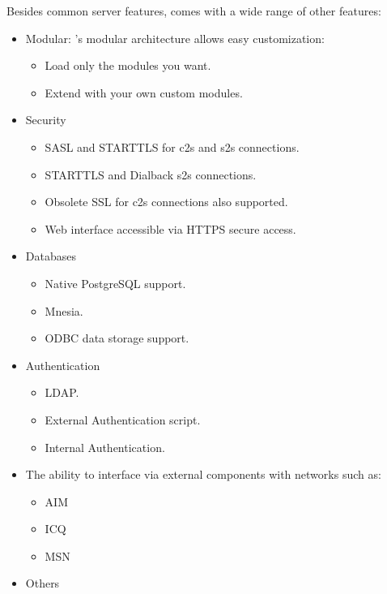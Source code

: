 Besides common \Jabber{} server features, \ejabberd{} comes with a wide range of other features:
\begin{itemize}
\item Modular: \ejabberd{}'s modular architecture allows easy customization:
\begin{itemize}
\item Load only the modules you want.
\item Extend \ejabberd{} with your own custom modules.
\end{itemize}
\item Security
\begin{itemize}
\item SASL and STARTTLS for c2s and s2s connections.\improved{}
\item STARTTLS and Dialback s2s connections.\new{}
\item Obsolete SSL for c2s connections also supported.
\item Web interface accessible via HTTPS secure access.
\end{itemize}
\item Databases
\begin{itemize}
\item Native PostgreSQL support. \new{}
\item Mnesia.
\item ODBC data storage support. \improved{}
\end{itemize}
\item Authentication
\begin{itemize}
\item LDAP. 
\item External Authentication script.
\item Internal Authentication.
\end{itemize}
\item The ability to interface via external components with networks such as:
\begin{itemize}
\item AIM
\item ICQ
\item MSN
\end{itemize}
\item Others
\begin{itemize}

\end{itemize}
\end{itemize}
